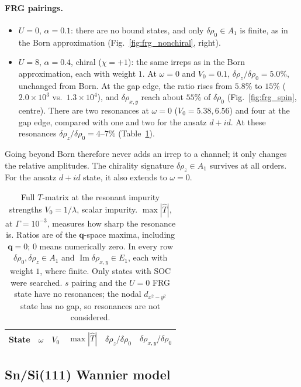 \documentclass[aps,prb,twocolumn,superscriptaddress,nofootinbib]{revtex4-2}
\newcommand{\bq}{\bm{q}}
\begin{document}
\paragraph{FRG pairings.}
\begin{itemize}
    \item $U = 0$, $\alpha = 0.1$: there are no bound states, and only $\delta\rho_0 \in A_1$ is finite, as in the Born approximation (Fig.~\ref{fig:frg_nonchiral}, right).
    \item $U = 8$, $\alpha = 0.4$, chiral ($\chi = +1$): the same irreps as in the Born approximation, each with weight $1$.
    At $\omega = 0$ and $V_0 = 0.1$, $\delta\rho_z/\delta\rho_0 = 5.0\%$, unchanged from Born.
    At the gap edge, the ratio rises from $5.8\%$ to $15\%$ ($2.0\times10^3$ vs.\ $1.3\times10^4$), and $\delta\rho_{x,y}$ reach about $55\%$ of $\delta\rho_0$ (Fig.~\ref{fig:frg_spin}, centre).
    There are two resonances at $\omega = 0$ ($V_0 = 5.38, 6.56$) and four at the gap edge, compared with one and two for the ansatz $d+id$.
    At these resonances $\delta\rho_z/\delta\rho_0 = 4$--$7\%$ (Table~\ref{tab:resonant}).
\end{itemize}
Going beyond Born therefore never adds an irrep to a channel; it only changes the relative amplitudes.
The chirality signature $\delta\rho_z \in A_1$ survives at all orders.
For the ansatz $d+id$ state, it also extends to $\omega = 0$.

\begin{table}[tp]
    \caption{Full $T$-matrix at the resonant impurity strengths $V_0 = 1/\lambda$, scalar impurity.
    $\max|\hat T|$, at $\Gamma = 10^{-3}$, measures how sharp the resonance is.
    Ratios are of the $\bq$-space maxima, including $\bq = 0$; $0$ means numerically zero.
    In every row $\delta\rho_0, \delta\rho_z \in A_1$ and $\operatorname{Im}\delta\rho_{x,y} \in E_1$, each with weight $1$, where finite.
    Only states with SOC were searched.
    $s$ pairing and the $U = 0$ FRG state have no resonances; the nodal $d_{x^2-y^2}$ state has no gap, so resonances are not considered.}
    \label{tab:resonant}
    \begin{ruledtabular}
    \begin{tabular}{llrrrr}
        State & $\omega$ & $V_0$ & $\max|\hat T|$ & $\delta\rho_z/\delta\rho_0$ & $\delta\rho_{x,y}/\delta\rho_0$ \\
        \hline
    \end{tabular}
    \end{ruledtabular}
\end{table}

\subsection{Sn/Si(111) Wannier model}



\end{document}
